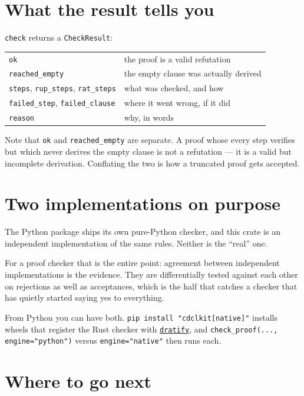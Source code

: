 \documentclass[11pt,a4paper]{article}
\newcommand{\pkg}[1]{\href{https://pypi.org/project/#1/}{\texttt{#1}}}
\begin{document}
\section{What the result tells you}

\texttt{check} returns a \texttt{CheckResult}:

\begin{center}
\begin{tabular}{ll}
\toprule
\texttt{ok} & the proof is a valid refutation \\
\texttt{reached\_empty} & the empty clause was actually derived \\
\texttt{steps}, \texttt{rup\_steps}, \texttt{rat\_steps} & what was checked, and how \\
\texttt{failed\_step}, \texttt{failed\_clause} & where it went wrong, if it did \\
\texttt{reason} & why, in words \\
\bottomrule
\end{tabular}
\end{center}

Note that \texttt{ok} and \texttt{reached\_empty} are separate. A proof whose
every step verifies but which never derives the empty clause is not a
refutation --- it is a valid but incomplete derivation. Conflating the two is
how a truncated proof gets accepted.

\section{Two implementations on purpose}

The Python package ships its own pure-Python checker, and this crate is an
independent implementation of the same rules. Neither is the ``real'' one.

For a proof checker that is the entire point: agreement between independent
implementations is the evidence. They are differentially tested against each
other on rejections as well as acceptances, which is the half that catches a
checker that has quietly started saying yes to everything.

From Python you can have both. \texttt{pip install "cdclkit[native]"} installs
wheels that register the Rust checker with \pkg{dratify}, and
\texttt{check\_proof(..., engine="python")} versus \texttt{engine="native"}
then runs each.

\section*{Where to go next}
\end{document}
